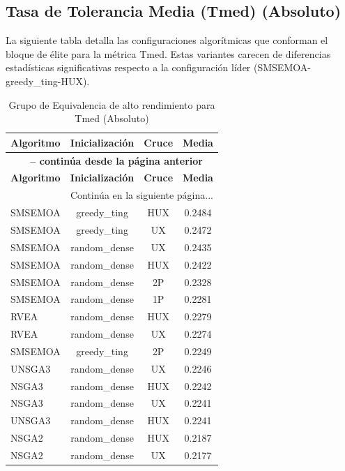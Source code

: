 \subsection{Tasa de Tolerancia Media (Tmed) (Absoluto)}\label{anexo:elite_avgt}

La siguiente tabla detalla las configuraciones algorítmicas que conforman el bloque de élite para la métrica Tmed. Estas variantes carecen de diferencias estadísticas significativas respecto a la configuración líder (SMSEMOA-greedy\_ting-HUX).

\begin{longtable}{lccc}
    \caption{Grupo de Equivalencia de alto rendimiento para Tmed (Absoluto)}
    \label{tab:elite_avgt} \\
    \toprule
    \textbf{Algoritmo} & \textbf{Inicialización} & \textbf{Cruce} & \textbf{Media} \\
    \midrule
    \endfirsthead
    \multicolumn{4}{c}{{\bfseries \tablename\ \thetable{} -- continúa desde la página anterior}} \\
    \toprule
    \textbf{Algoritmo} & \textbf{Inicialización} & \textbf{Cruce} & \textbf{Media} \\
    \midrule
    \endhead
    \midrule \multicolumn{4}{r}{{Continúa en la siguiente página...}} \\
    \endfoot
    \bottomrule
    \endlastfoot
    SMSEMOA & greedy\_ting & HUX & 0.2484 \\
SMSEMOA & greedy\_ting & UX & 0.2472 \\
SMSEMOA & random\_dense & UX & 0.2435 \\
SMSEMOA & random\_dense & HUX & 0.2422 \\
SMSEMOA & random\_dense & 2P & 0.2328 \\
SMSEMOA & random\_dense & 1P & 0.2281 \\
RVEA & random\_dense & HUX & 0.2279 \\
RVEA & random\_dense & UX & 0.2274 \\
SMSEMOA & greedy\_ting & 2P & 0.2249 \\
UNSGA3 & random\_dense & UX & 0.2246 \\
NSGA3 & random\_dense & HUX & 0.2242 \\
NSGA3 & random\_dense & UX & 0.2241 \\
UNSGA3 & random\_dense & HUX & 0.2241 \\
NSGA2 & random\_dense & HUX & 0.2187 \\
NSGA2 & random\_dense & UX & 0.2177 \\

\end{longtable}
